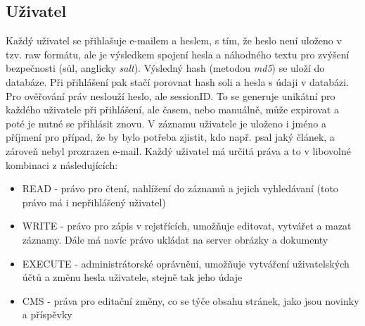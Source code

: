 \subsection{Uživatel}
Každý uživatel se přihlašuje e-mailem a heslem, s tím, že heslo není uloženo v
tzv. raw formátu, ale je výsledkem spojení hesla a náhodného textu pro zvýšení
bezpečnosti (sůl, anglicky \textit{salt}). Výsledný hash (metodou \textit{md5}) se uloží
do databáze. Při přihlášení pak stačí porovnat hash soli a hesla s údaji v
databázi. Pro ověřování práv neslouží heslo, ale sessionID. To se generuje
unikátní pro každého uživatele při přihlášení, ale časem, nebo manuálně, může
expirovat a poté je nutné se přihlásit znovu. V záznamu uživatele je uloženo i
jméno a příjmení pro případ, že by bylo potřeba zjistit, kdo např. psal jaký
článek, a zároveň nebyl prozrazen e-mail. Každý uživatel má určitá práva a to v
libovolné kombinaci z následujících:
\begin{itemize}
     \item READ - právo pro čtení, nahlížení do záznamů a jejich vyhledávaní (toto právo má i nepřihlášený uživatel)
     \item WRITE - právo pro zápis v rejstřících, umožňuje editovat, vytvářet a mazat záznamy. Dále má navíc právo ukládat na server obrázky a dokumenty
     \item EXECUTE - administrátorské oprávnění, umožňuje vytváření uživatelských účtů a změnu hesla uživatele, stejně tak jeho údaje
     \item CMS - práva pro editační změny, co se týče obsahu stránek, jako jsou novinky a příspěvky
\end{itemize}

